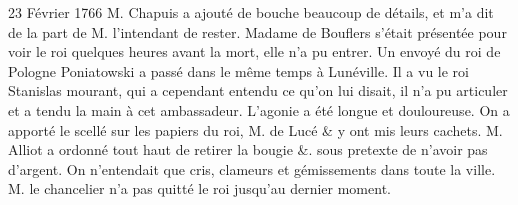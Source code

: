 \begin{diary}{23 Février 1766}{}
                           M. Chapuis a ajouté de bouche
                           beaucoup de
                           détails, et m'a dit de la part de M.
                              l'intendant
                           de rester. Madame de Bouflers s'était présentée
                           pour voir le roi quelques
                           heures avant la
                           mort, elle n'a pu entrer. Un envoyé du roi
                              de Pologne Poniatowski a passé dans le même
                           temps à Lunéville. Il a
                           vu le roi Stanislas
                           mourant, qui a cependant entendu ce qu'on
                           lui disait, il n'a pu articuler et a tendu la main à cet
                           ambassadeur. L'agonie a été
                           longue et douloureuse. On a apporté le scellé
                           sur les papiers du roi,
                              M. de Lucé \&
                           y ont mis leurs cachets. M.
                              Alliot a ordonné
                           tout haut de retirer la bougie \&. sous pretexte
                           de n'avoir pas d'argent. On n'entendait que
                           cris, clameurs et gémissements dans toute
                           la ville. M. le chancelier
                           n'a pas quitté le
                              roi jusqu'au dernier moment. \bigskip


                     \end{diary}

